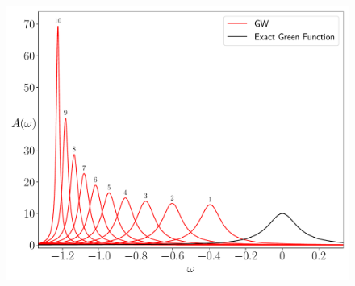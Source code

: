 \documentclass[12pt]{article}
\begin{document}
\begin{figure}[h!]
\center
\includegraphics[scale=0.6]{ccomp.pdf}
\end{figure}\\
\end{document}
